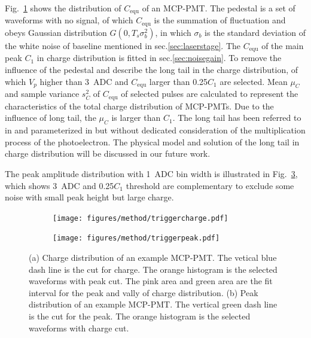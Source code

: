 Fig.~\ref{fig:triggercharge} shows the distribution of $C_{\mathrm{equ}}$ of an MCP-PMT. The pedestal is a set of waveforms with no signal, of which $C_{\mathrm{equ}}$ is the summation of fluctuation and obeys Gaussian distribution $G(0, T_s\sigma_b^2)$, in which $\sigma_b$ is the standard deviation of the white noise of baseline mentioned in sec.\ref{sec:laserstage}. The $C_{\mathrm{equ}}$ of the main peak $C_1$ in charge distribution is fitted in sec.\ref{sec:noisegain}. To remove the influence of the pedestal and describe the long tail in the charge distribution, of which $V_p$ higher than \SI{3}{ADC} and $C_{\mathrm{equ}}$ larger than 0.25$C_1$ are selected. Mean $\mu_{C}$ and sample variance $s^2_{C}$ of $C_{\mathrm{equ}}$ of selected pulses are calculated to represent the characteristics of the total charge distribution of MCP-PMTs. Due to the influence of long tail, the $\mu_{C}$ is larger than $C_1$. The long tail has been referred to in \cite{JUNOMassTesting} and parameterized in \cite{JUNOLongtail} but without dedicated consideration of the multiplication process of the photoelectron. The physical model and solution of the long tail in charge distribution will be discussed in our future work.

The peak amplitude distribution with \SI{1}{ADC} bin width is illustrated in Fig.~\ref{fig:triggerpeak}, which shows \SI{3}{ADC} and 0.25$C_1$ threshold are complementary to exclude some noise with small peak height but large charge.

\begin{figure}[!htbp]
    \centering
    \begin{subfigure}[b]{\SF\textwidth}
        \texttt{[image: figures/method/triggercharge.pdf]}
        \caption{}%
        \label{fig:triggercharge}
    \end{subfigure}
    \begin{subfigure}[b]{\SF\textwidth}
        \texttt{[image: figures/method/triggerpeak.pdf]}
        \caption{}%
        \label{fig:triggerpeak}
    \end{subfigure}
    \caption{(a) Charge distribution of an example MCP-PMT. The vetical blue dash line is the cut for charge. The orange histogram is the selected waveforms with peak cut. The pink area and green area are the fit interval for the peak and vally of charge distribution. (b) Peak distribution of an example MCP-PMT. The vertical green dash line is the cut for the peak. The orange histogram is the selected waveforms with charge cut.}
\end{figure}

